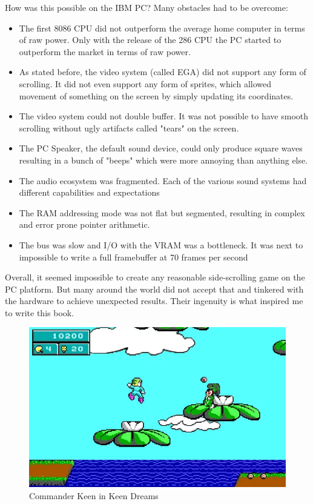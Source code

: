 \documentclass[book.tex]{subfiles}
\begin{document}
How was this possible on the IBM PC? Many obstacles had to be overcome:
\begin{itemize}
  \item The first 8086 CPU did not outperform the average home computer in terms of raw power. Only with the release of the 286 CPU the PC started to outperform the market in terms of raw power.
  \item As stated before, the video system (called EGA) did not support any form of scrolling. It did not even support any form of sprites, which allowed movement of something on the screen by simply updating its  coordinates.
  \item The video system could not double buffer. It was not possible to have smooth scrolling without ugly artifacts called "tears" on the screen.
  \item The PC Speaker, the default sound device, could only produce square waves resulting in a bunch of "beeps" which were more annoying than anything else.
  \item The audio ecosystem was fragmented. Each of the various sound systems had
different capabilities and expectations
  \item The RAM addressing mode was not flat but segmented, resulting in complex and
error prone pointer arithmetic.
  \item The bus was slow and I/O with the VRAM was a bottleneck. It was next to impossible to write a full framebuffer at 70 frames per second
\end{itemize}
\par



Overall, it seemed impossible to create any reasonable side-scrolling game on the PC platform. But many around the world did not accept that and tinkered with the hardware to achieve unexpected results. Their ingenuity is what inspired me to write this book. \\


\begin{figure}[H]
  \centering
 \includegraphics[width=1.0\textwidth]{screenshots_300dpi/Keen_Dreams.png}
\caption{Commander Keen in Keen Dreams}
\end{figure}
\end{document}
